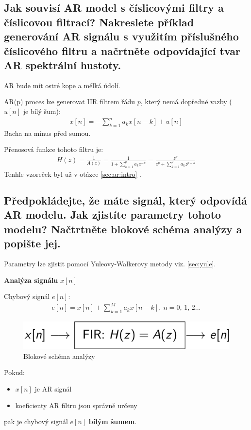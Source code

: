 \documentclass[a4paper,12pt]{article}   %
\newcommand{\mt}[1]{$#1$}
\begin{document}
\subsection{Jak souvisí AR model s číslicovými filtry a číslicovou filtrací? Nakreslete příklad generování AR signálu s využitím příslušného číslicového filtru a načrtněte odpovídající tvar AR spektrální hustoty.}
AR  bude mít ostré kope a mělká údolí.

AR(p) proces lze generovat IIR filtrem řádu \mt{p}, který nemá dopředné vazby (\mt{u[n]} je bílý šum):
\begin{align*}
        x[n] = -\sum^p_{k=1}a_k x[n-k] + u[n]
\end{align*}
Bacha na mínus před sumou.

Přenosová funkce tohoto filtru je:
\begin{align*}
        H(z) = \frac{1}{A(z)} = \frac{1}{1+\sum_{k=1}^p a_k z^{-k}} = \frac{z^p}{z^p + \sum_{k=1}^p a_k z^{p-k}}
\end{align*}
Tenhle vzoreček byl už v otázce \ref{sec:ar:intro} .


\subsection{Předpokládejte, že máte signál, který odpovídá AR modelu. Jak zjistíte parametry tohoto modelu? Načtrtněte blokové schéma analýzy a popište jej.}
Parametry lze zjistit pomocí Yuleovy-Walkerovy metody viz. \ref{sec:yule}. 

\textbf{Analýza signálu} \mt{x[n]}

Chybový signál \mt{e[n]}:
\begin{align*}
        e[n] = x[n] + \sum_{k=1}^M a_k x[n-k],~n=0,\,1,\,2...
\end{align*}

\begin{figure}[h!]
        \centering
        \includegraphics[width=.6\textwidth]{fig/AR_analysis_scheme.png}
        \caption*{Blokové schéma analýzy}
\end{figure}

Pokud:
\begin{itemize}
        \item \mt{x[n]} je AR signál
        \item koeficienty AR filtru jsou správně určeny
\end{itemize}
pak je chybový signál \mt{e[n]} \textbf{bílým šumem}.
\end{document}
